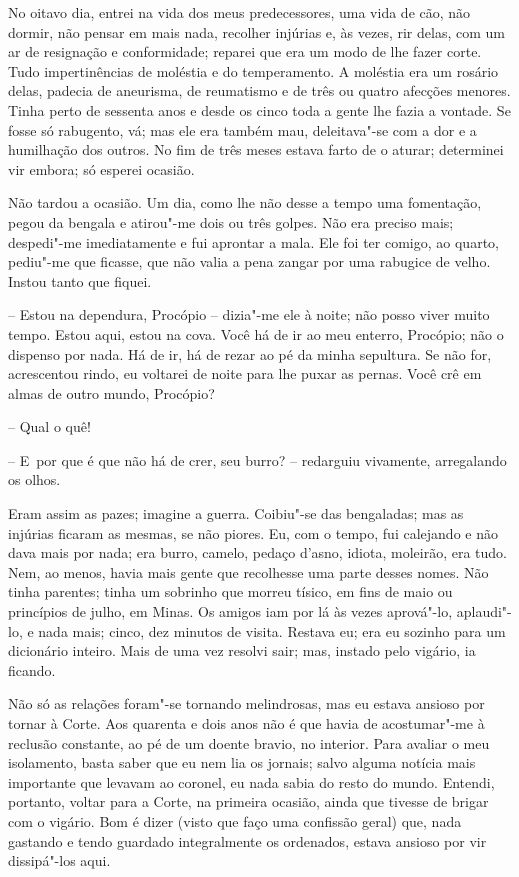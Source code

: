 No oitavo dia, entrei na vida dos meus predecessores, uma vida de cão,
não dormir, não pensar em mais nada, recolher injúrias e, às vezes, rir
delas, com um ar de resignação e conformidade; reparei que era um modo
de lhe fazer corte. Tudo impertinências de moléstia e do temperamento. A
moléstia era um rosário delas, padecia de aneurisma, de reumatismo e de
três ou quatro afecções menores. Tinha perto de sessenta anos e desde os
cinco toda a gente lhe fazia a vontade. Se fosse só rabugento, vá; mas
ele era também mau, deleitava"-se com a dor e a humilhação dos outros. No
fim de três meses estava farto de o aturar; determinei vir embora; só
esperei ocasião.

Não tardou a ocasião. Um dia, como lhe não desse a tempo uma fomentação,
pegou da bengala e atirou"-me dois ou três golpes. Não era preciso mais;
despedi"-me imediatamente e fui aprontar a mala. Ele foi ter comigo, ao
quarto, pediu"-me que ficasse, que não valia a pena zangar por uma
rabugice de velho. Instou tanto que fiquei.

-- Estou na dependura, Procópio -- dizia"-me ele à noite; não posso viver
muito tempo. Estou aqui, estou na cova. Você há de ir ao meu enterro,
Procópio; não o dispenso por nada. Há de ir, há de rezar ao pé da minha
sepultura. Se não for, acrescentou rindo, eu voltarei de noite para lhe
puxar as pernas. Você crê em almas de outro mundo, Procópio?

-- Qual o quê!

-- E~por que é que não há de crer, seu burro? -- redarguiu vivamente,
arregalando os olhos.

Eram assim as pazes; imagine a guerra. Coibiu"-se das bengaladas; mas as
injúrias ficaram as mesmas, se não piores. Eu, com o tempo, fui
calejando e não dava mais por nada; era burro, camelo, pedaço d'asno,
idiota, moleirão, era tudo. Nem, ao menos, havia mais gente que
recolhesse uma parte desses nomes. Não tinha parentes; tinha um sobrinho
que morreu tísico, em fins de maio ou princípios de julho, em Minas. Os
amigos iam por lá às vezes aprová"-lo, aplaudi"-lo, e nada mais; cinco,
dez minutos de visita. Restava eu; era eu sozinho para um dicionário
inteiro. Mais de uma vez resolvi sair; mas, instado pelo vigário, ia
ficando.

Não só as relações foram"-se tornando melindrosas, mas eu estava ansioso
por tornar à Corte. Aos quarenta e dois anos não é que havia de
acostumar"-me à reclusão constante, ao pé de um doente bravio, no
interior. Para avaliar o meu isolamento, basta saber que eu nem lia os
jornais; salvo alguma notícia mais importante que levavam ao coronel, eu
nada sabia do resto do mundo. Entendi, portanto, voltar para a Corte, na
primeira ocasião, ainda que tivesse de brigar com o vigário. Bom é dizer
(visto que faço uma confissão geral) que, nada gastando e tendo guardado
integralmente os ordenados, estava ansioso por vir dissipá"-los aqui.

